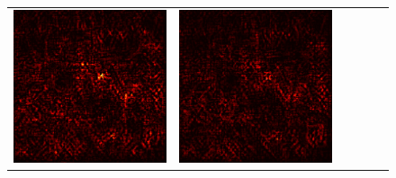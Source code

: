 \documentclass[preprint,12pt]{elsarticle}
\begin{document}
\begin{figure}[p]
\begin{tabular}{cccccc}
  \includegraphics[scale=\scale]{../visualizations/examples/imagenette/resnet18/positive_saliency_map/2.png} & 
  \includegraphics[scale=\scale]{../visualizations/examples/imagenette/resnet18/negative_saliency_map/2.png} & 

\end{tabular}
\end{figure}
\end{document}
